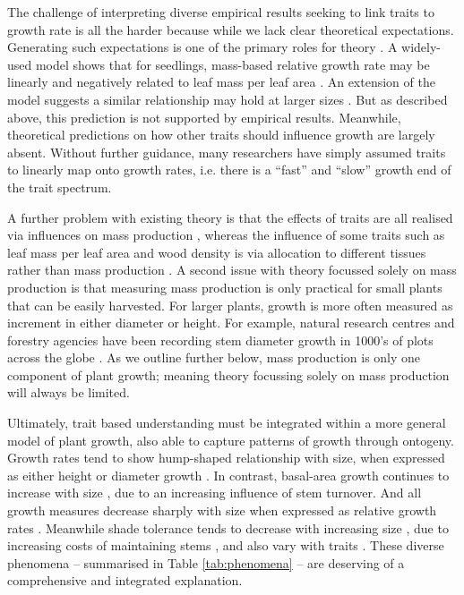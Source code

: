 \documentclass[a4paper,11pt]{article}
\begin{document}
The challenge of interpreting diverse empirical results seeking to link traits to growth rate is all the harder because while we lack clear theoretical expectations. Generating such expectations is one of the primary roles for theory \citep{Kokko-2007}. A widely-used model shows that for seedlings, mass-based relative growth rate may be linearly and negatively related to leaf mass per leaf area \citep{Lambers-1992, Cornelissen-1996, Wright-2000}. An extension of the model suggests a similar relationship may hold at larger sizes \citep{Enquist-2007}. But as described above, this prediction is not supported by empirical results. Meanwhile, theoretical predictions on how other traits should influence growth are largely absent. Without further guidance, many researchers have simply assumed traits to linearly map onto growth rates, i.e. there is a ``fast'' and ``slow'' growth end of the trait spectrum.

A further problem with existing theory is that the effects of traits are all realised via influences on mass production \citep{Enquist-2007}, whereas the influence of some traits such as leaf mass per leaf area and wood density is via allocation to different tissues rather than mass production \citep{Falster-2011, Gibert-2016}. A second issue with theory focussed solely on mass production is that measuring mass production is only practical for small plants that can be easily harvested. For larger plants, growth is more often measured as increment in either diameter or height. For example, natural research centres and forestry agencies have been recording stem diameter growth in 1000's of plots across the globe \citep{Purves-2008, Anderson-2015, Kunstler-2016}. As we outline further below, mass production is only one component of plant growth; meaning theory focussing solely on mass production will always be limited.

Ultimately, trait based understanding must be integrated within a more general model of plant growth, also able to capture patterns of growth through ontogeny. Growth rates tend to show hump-shaped relationship with size, when expressed as either height \citep{Sillett-2010, King-2011} or diameter growth \citep{Herault-2011}. In contrast, basal-area growth continues to increase with size \citep{Sillett-2010, Stephenson-2014}, due to an increasing influence of stem turnover. And all growth measures decrease sharply with size when expressed as relative growth rates \citep{Rees-2010, Iida-2014}. Meanwhile shade tolerance tends to decrease with increasing size \citep{Lusk-2006}, due to increasing costs of maintaining stems \citep{Givnish-1988}, and also vary with traits \citep{Lusk-2006,Poorter-2006}. These diverse phenomena -- summarised in Table \ref{tab:phenomena} -- are deserving of a comprehensive and integrated explanation.
\end{document}
